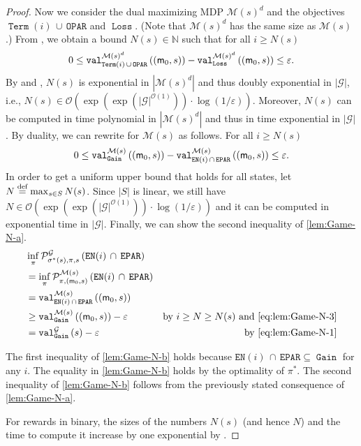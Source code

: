 \documentclass[a4paper,UKenglish,cleveref,autoref,thm-restate]{lipics-v2021}
\DeclareMathOperator{\Term}{\mathtt{Term}}
\DeclareMathOperator{\Gain}{\mathtt{Gain}}
\DeclareMathOperator{\Loss}{\mathtt{Loss}}
\newcommand{\Eparity}{\mathtt{EPAR}}
\newcommand{\Oparity}{\mathtt{OPAR}}
\newcommand{\en}{\mathtt{EN}}
\newcommand{\+}[1]{\mathbb{#1}}
\newcommand{\?}[1]{\mathcal{#1}}
\newcommand{\N}{\+{N}}
\newcommand{\Ocompl}{\?{O}}
\newcommand{\abs}[1]{\lvert#1\rvert}
\newcommand{\size}[1]{\abs{#1}}
\newcommand{\eqby}[2][=]{\stackrel{\text{{\tiny{#2}}}}{#1}}
\newcommand{\eqdef}{\eqby{def}}
\newcommand{\eps}{\varepsilon}
\newcommand{\Prob}[2][]{\mathcal{P}^{#1}_{#2}}
\newcommand{\lrc}[1]{\left(#1\right)}
\newcommand{\tuple}[1]{\lrc{#1}}
\newcommand{\game}{{\mathcal G}}
\newcommand{\mdp}{{\mathcal M}}
\newcommand{\states}{S}
\newcommand{\s}{s}
\newcommand{\zstrat}{\sigma}
\newcommand{\ostrat}{\pi}
\newcommand{\optzstrat}{\zstrat^*}
\newcommand{\optostrat}{\ostrat^*}
\newcommand{\memconf}{{\sf m}}
\newcommand{\initmem}{\memconf_0}
\begin{document}
\begin{proof}
Now we consider the dual maximizing MDP $\mdp(\s)^d$ and the objectives
$\Term(i)\, \cup\, \Oparity$ and $\Loss$. (Note that $\mdp(\s)^d$ has the same
size as $\mdp(\s)$.)
From , we obtain
a bound $N(\s) \in \N$ such that for all $i \ge N(\s)$
\begin{equation}\label{eq:lem:Game-N-2}
0\le \valueof[\mdp(\s)^d][\Term(i)\, \cup\, \Oparity]{\tuple{\initmem,\s}} -\valueof[\mdp(\s)^d][\Loss]{\tuple{\initmem,\s}} \le \eps.
\end{equation}
By  and ,
$N(\s)$ is exponential in $|\mdp(\s)^d|$ and thus doubly exponential
in $|\game|$, i.e.,
$N(\s) \in {\Ocompl}\left(\exp(\exp(\size{\game}^{\Ocompl(1)}))\cdot \log\lrc{1/\eps}\right)$.
Moreover, $N(\s)$ can be computed in time polynomial in $|\mdp(\s)^d|$
and thus in time exponential in $|\game|$.
By duality, we can rewrite  for $\mdp(\s)$ as follows.
For all $i \ge N(\s)$
\begin{equation}\label{eq:lem:Game-N-3}
  0
  \le
  \valueof[\mdp(\s)][\Gain]{\tuple{\initmem,\s}} -
  \valueof[\mdp(\s)][\en(i)\, \cap\, \Eparity]{\tuple{\initmem,\s}}
  \le
  \eps.
\end{equation}
  In order to get a uniform upper bound that holds for all states,
  let $N \eqdef \max_{\s \in \states} N(\s)$.
  Since $|\states|$ is linear, we still have 
  $N \in {\Ocompl}\left(\exp(\exp(\size{\game}^{\Ocompl(1)}))\cdot \log\lrc{1/\eps}\right)$
  and it can be computed in exponential time in $|\game|$.
  Finally, we can show the second inequality of \eqref{lem:Game-N-a}.
  \begin{align*}
    & \inf_\ostrat \Prob[\game]{\optzstrat(\s),\ostrat,\s}\lrc{\en(i)\,\cap\,\Eparity}\\
    & = \inf_\ostrat \Prob[\mdp(\s)]{\ostrat,\tuple{\initmem,\s}}\lrc{\en(i)\,\cap\,\Eparity}\\
    & = \valueof[\mdp(\s)][\en(i)\,\cap\,\Eparity]{\tuple{\initmem,\s}}\\
    & \ge \valueof[\mdp(\s)][\Gain]{\tuple{\initmem,\s}} - \eps
    & \mbox{by $i \ge N \ge N(\s)$ and \Cref{eq:lem:Game-N-3}}\\
    & = \valueof[\game][\Gain]{\s} - \eps
    & \mbox{by \eqref{eq:lem:Game-N-1}}
  \end{align*}

 The first inequality of \eqref{lem:Game-N-b} holds because 
 $\en(i)\, \cap\, \Eparity \subseteq \Gain$ for any $i$.
 The equality in \eqref{lem:Game-N-b} holds by the
 optimality of $\optostrat$.
 The second inequality of \eqref{lem:Game-N-b} follows from the previously
 stated consequence of \eqref{lem:Game-N-a}.
   
For rewards in binary, the sizes of the numbers $N(\s)$ (and hence $N$)
and the time to compute it increase by one exponential by .
\end{proof}
\end{document}
